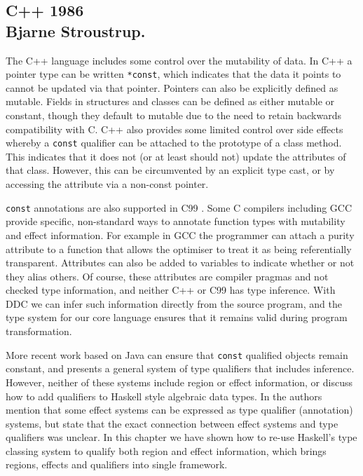 \subsection{C++ 1986 \\Bjarne Stroustrup. }
The C++ language \cite{stroustrup:cpp, cpp-standard} includes some control over the mutability of data. In C++ a pointer type can be written \texttt{*const}, which indicates that the data it points to cannot be updated via that pointer. Pointers can also be explicitly defined as mutable. Fields in structures and classes can be defined as either mutable or constant, though they default to mutable due to the need to retain backwards compatibility with C. C++ also provides some limited control over side effects whereby a \texttt{const} qualifier can be attached to the prototype of a class method. This indicates that it does not (or at least should not) update the attributes of that class. However, this can be circumvented by an explicit type cast, or by accessing the attribute via a non-const pointer.

\texttt{const} annotations are also supported in C99 \cite{c99-standard}. Some C compilers including GCC \cite{gcc-4.3.2} provide specific, non-standard ways to annotate function types with mutability and effect information. For example in GCC the programmer can attach a purity attribute to a function that allows the optimiser to treat it as being referentially transparent. Attributes can also be added to variables to indicate whether or not they alias others. Of course, these attributes are compiler pragmas and not checked type information, and neither C++ or C99 has type inference. With DDC we can infer such information directly from the source program, and the type system for our core language ensures that it remains valid during program transformation. 

More recent work based on Java  \cite{birka:reference-immutability} can ensure that \texttt{const} qualified objects remain constant, and \cite{foster:type-qualifiers} presents a general system of type qualifiers that includes inference. However, neither of these systems include region or effect information, or discuss how to add qualifiers to Haskell style algebraic data types. In \cite{foster:type-qualifiers} the authors mention that some effect systems can be expressed as type qualifier (annotation) systems, but state that the exact connection between effect systems and type qualifiers was unclear. In this chapter we have shown how to re-use Haskell's type classing system to qualify both region and effect information, which brings regions, effects and qualifiers into single framework. 


